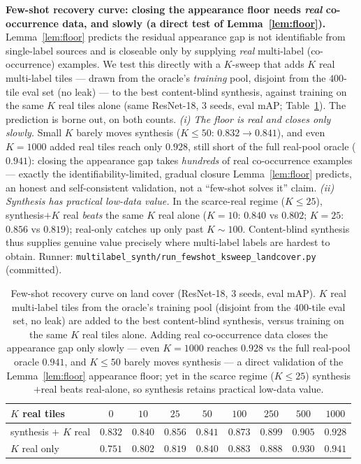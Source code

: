 \documentclass[11pt]{article}
\begin{document}
\textbf{Few-shot recovery curve: closing the appearance floor needs \emph{real} co-occurrence
data, and slowly (a direct test of Lemma~\ref{lem:floor}).} Lemma~\ref{lem:floor} predicts the
residual appearance gap is not identifiable from single-label sources and is closeable only by
supplying \emph{real} multi-label (co-occurrence) examples. We test this directly with a
$K$-sweep that adds $K$ real multi-label tiles --- drawn from the oracle's \emph{training} pool,
disjoint from the $400$-tile eval set (no leak) --- to the best content-blind synthesis, against
training on the same $K$ real tiles alone (same ResNet-18, $3$ seeds, eval mAP;
Table~\ref{tab:fewshot}). The prediction is borne out, on both counts.
\emph{(i) The floor is real and closes only slowly.} Small $K$ barely moves synthesis
($K\le50$: $0.832\to0.841$), and even $K{=}1000$ added real tiles reach only $0.928$, still
short of the full real-pool oracle ($0.941$): closing the appearance gap takes \emph{hundreds}
of real co-occurrence examples --- exactly the identifiability-limited, gradual closure
Lemma~\ref{lem:floor} predicts, an honest and self-consistent validation, not a
``few-shot solves it'' claim.
\emph{(ii) Synthesis has practical low-data value.} In the scarce-real regime ($K\le25$),
synthesis${+}K$ real \emph{beats} the same $K$ real alone ($K{=}10$: $0.840$ vs $0.802$;
$K{=}25$: $0.856$ vs $0.819$); real-only catches up only past $K{\sim}100$. Content-blind
synthesis thus supplies genuine value precisely where multi-label labels are hardest to obtain.
Runner: \texttt{multilabel\_synth/run\_fewshot\_ksweep\_landcover.py} (committed).

\begin{table}[t]
\centering
\caption{Few-shot recovery curve on land cover (ResNet-18, $3$ seeds, eval mAP). $K$ real
multi-label tiles from the oracle's training pool (disjoint from the $400$-tile eval set, no
leak) are added to the best content-blind synthesis, versus training on the same $K$ real tiles
alone. Adding real co-occurrence data closes the appearance gap only slowly --- even $K{=}1000$
reaches $0.928$ vs the full real-pool oracle $0.941$, and $K\le50$ barely moves synthesis ---
a direct validation of the Lemma~\ref{lem:floor} appearance floor; yet in the scarce regime
($K\le25$) synthesis${+}$real beats real-alone, so synthesis retains practical low-data value.}
\label{tab:fewshot}
\begin{tabular}{lcccccccc}
\toprule
$K$ real tiles          & $0$     & $10$    & $25$    & $50$    & $100$   & $250$   & $500$   & $1000$  \\
\midrule
synthesis $+$ $K$ real  & $0.832$ & $0.840$ & $0.856$ & $0.841$ & $0.873$ & $0.899$ & $0.905$ & $0.928$ \\
$K$ real only           & $0.751$ & $0.802$ & $0.819$ & $0.840$ & $0.883$ & $0.888$ & $0.930$ & $0.941$ \\
\bottomrule
\end{tabular}
\end{table}
\end{document}
